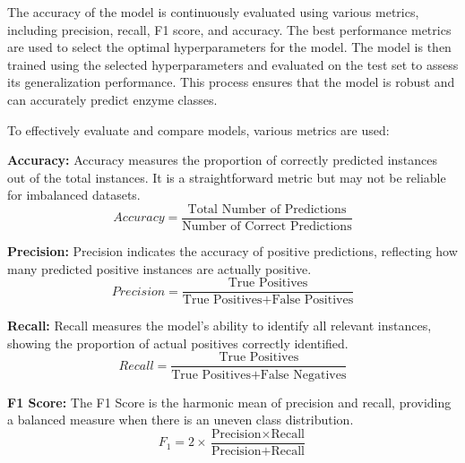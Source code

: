 The accuracy of the model is continuously evaluated using various metrics, including precision, recall, F1 score, and accuracy. The best performance metrics are used to select the optimal hyperparameters for the model. The model is then trained using the selected hyperparameters and evaluated on the test set to assess its generalization performance. This process ensures that the model is robust and can accurately predict enzyme classes.

To effectively evaluate and compare models, various metrics are used: \autocite{sudhamathyBayesianCNNLSTMClassification2023}

\textbf{Accuracy:} Accuracy measures the proportion of correctly predicted instances out of the total instances. It is a straightforward metric but may not be reliable for imbalanced datasets.
\begin{equation}
    Accuracy = \frac{\text{Total Number of Predictions}}{\text{Number of Correct Predictions}}
\end{equation}

\textbf{Precision:} Precision indicates the accuracy of positive predictions, reflecting how many predicted positive instances are actually positive.
\begin{equation}
    Precision = \frac{\text{True Positives}}{\text{True Positives} + \text{False Positives}}
\end{equation}

\textbf{Recall:} Recall measures the model’s ability to identify all relevant instances, showing the proportion of actual positives correctly identified.
\begin{equation}
    Recall = \frac{\text{True Positives}}{\text{True Positives} + \text{False Negatives}}
\end{equation}

\textbf{F1 Score:} The F1 Score is the harmonic mean of precision and recall, providing a balanced measure when there is an uneven class distribution.
\begin{equation}
    F_1 = 2 \times \frac{\text{Precision} \times \text{Recall}}{\text{Precision} + \text{Recall}}
\end{equation}